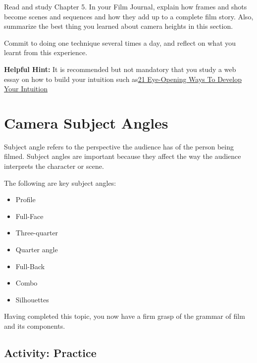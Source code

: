 \documentclass[
]{book}
\providecommand{\tightlist}{%
  \setlength{\itemsep}{0pt}\setlength{\parskip}{0pt}}
\begin{document}
\begin{reflect}
Read and study Chapter 5. In your Film Journal, explain how frames and shots become scenes and sequences and how they add up to a complete film story. Also, summarize the best thing you learned about camera heights in this section.

Commit to doing one technique several times a day, and reflect on what you learnt from this experience.

\textbf{Helpful Hint:} It is recommended but not mandatory that you study a web essay on how to build your intuition such as\href{https://liveboldandbloom.com/04/self-improvement/develop-your-intuition}{21 Eye-Opening Ways To Develop Your Intuition}
\end{reflect}

\hypertarget{camera-subject-angles}{%
\section{Camera Subject Angles}\label{camera-subject-angles}}

Subject angle refers to the perspective the audience has of the person being filmed. Subject angles are important because they affect the way the audience interprets the character or scene.

The following are key subject angles:

\begin{itemize}
\tightlist
\item
  Profile\\
\item
  Full-Face\\
\item
  Three-quarter\\
\item
  Quarter angle\\
\item
  Full-Back\\
\item
  Combo\\
\item
  Silhouettes
\end{itemize}

Having completed this topic, you now have a firm grasp of the grammar of film and its components.

\hypertarget{activity-practice}{%
\subsection*{Activity: Practice}\label{activity-practice}}
\end{document}

